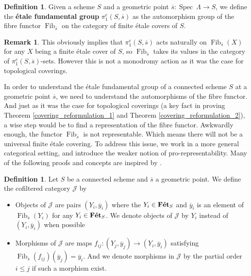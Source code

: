 \documentclass{article}
\theoremstyle{plain}
\theoremstyle{definition}
\newtheorem{definition}[theorem]{Definition}
\newtheorem{remark}{Remark}
\DeclareMathOperator{\Fib}{Fib}
\DeclareMathOperator{\Spec}{Spec}
\DeclareMathOperator{\Fet}{\bf{F\acute{e}t}}
\begin{document}
\begin{definition}
    Given a scheme $S$ and a geometric point $\overline{s}:\Spec\:\Lambda\rightarrow S$, we define the \textbf{\'etale fundamental group} $\pi_1^e(S,\overline{s})$ as the automorphism group of the fibre functor $\Fib_{\overline{s}}$ on the category of finite \'etale covers of $S$.
\end{definition}


\begin{remark}
    This obviously implies that $\pi_1^e(S,\overline{s})$ acts naturally on $\Fib_{\overline{s}}(X)$ for any $X$ being a finite \'etale cover of $S$, so $\Fib_{\overline{s}}$ takes its values in the category of $\pi^e_1(S,\overline{s})$-sets. However this is not a monodromy action as it was the case for topological coverings.
\end{remark}



\noindent In order to understand the \'etale fundamental group of a connected scheme $S$ at a geometric point $\overline{s}$, we need to understand the automorphisms of the fibre functor. 
And just as it was the case for topological coverings (a key fact in proving Theorem \ref{covering_reformulation_1} and Theorem \ref{covering_reformulation_2}), a wise step would be to find a representation of the fibre functor. 
Awkwardly enough, the functor $\Fib_{\overline{s}}$ is not representable.
Which means there will not be a universal finite \'etale covering.
To address this issue, we work in a more general categorical setting, and introduce the weaker notion of pro-representability.
Many of the following proofs and concepts are inspired by \cite{fundamental_group_of_schemes_thesis}.






\begin{definition}
    Let $S$ be a connected scheme and $\overline{s}$ a geometric point. We define the cofiltered category $\mathcal{J}$ by 
    \begin{itemize}
        \item[$a)$] Objects of $\mathcal{J}$ are pairs $(Y_i,\overline{y}_i)$ where the $Y_i \in \Fet_S$ and $\overline{y}_i$ is an element of $\Fib_{\overline{s}}(Y_i)$ for any $Y_i \in \Fet_S$. We denote objects of $\mathcal{J}$ by $Y_i$ instead of $(Y_i,\overline{y}_i)$ when possible
        \item [$b)$] Morphisms of $\mathcal{J}$ are maps $f_{ij}: (Y_j,\overline{y}_j)\rightarrow (Y_i,\overline{y}_i)$ satisfying $\Fib_{\overline{s}}(f_{ij})(\overline{y}_j) = \overline{y}_i$. And we denote morphisms in $\mathcal{J}$ by the partial order $i\leq j$ if such a morphism exist.
    \end{itemize}
\end{definition}
\end{document}
